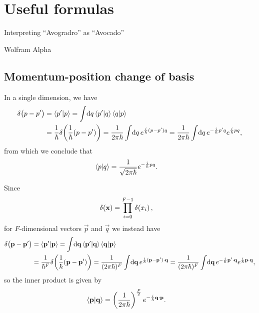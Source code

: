 \chapter{Useful formulas}

\epigraph{
Interpreting ``Avogradro'' as ``Avocado''
}{
Wolfram Alpha
}


\section{Momentum-position change of basis}

In a single dimension, we have~\cite[55-56]{sakurai1985modern}
\begin{subequations}
\begin{align}
	\ddf{p - p'}
	&= \braket{p' | p}
	= \int\! \dif q \braket{p' | q} \braket{q | p} \\
	&= \frac{1}{\hbar} \ddf{\frac{1}{\hbar} (p - p')}
	= \frac{1}{2 \pi \hbar} \int\! \dif q \, e^{\frac{i}{\hbar} (p - p') q}
	= \frac{1}{2 \pi \hbar} \int\! \dif q \, e^{-\frac{i}{\hbar} p' q} e^{\frac{i}{\hbar} p q},
\end{align}
\end{subequations}
from which we conclude that
\begin{align}
	\braket{p | q}
	&= \frac{1}{\sqrt{2 \pi \hbar}} e^{-\frac{i}{\hbar} p q}.
\end{align}

Since~\cite[59]{sakurai1985modern}
\begin{align}
	\delta\!\left( \bm{\mathbf{x}} \right)
	&= \prod_{i=0}^{F-1} \delta\!\left( x_i \right),
\end{align}
for $F$-dimensional vectors $\vec{p}$ and $\vec{q}$ we instead have
\begin{subequations}
\begin{align}
	\ddf{\vec{p} - \vec{p}'}
	&= \braket{\vec{p}' | \vec{p}}
	= \int\! \dif \vec{q} \braket{\vec{p}' | \vec{q}} \braket{\vec{q} | \vec{p}} \\
	&= \frac{1}{\hbar^F} \ddf{\frac{1}{\hbar} (\vec{p} - \vec{p}')}
	= \frac{1}{(2 \pi \hbar)^F} \int\! \dif \vec{q} \, e^{\frac{i}{\hbar} (\vec{p} - \vec{p}') \cdot \vec{q}}
	= \frac{1}{(2 \pi \hbar)^F} \int\! \dif \vec{q} \, e^{-\frac{i}{\hbar} \vec{p}' \cdot \vec{q}} e^{\frac{i}{\hbar} \vec{p} \cdot \vec{q}},
\end{align}
\end{subequations}
so the inner product is given by
\begin{align}
	\braket{\bm{\mathbf{p}} | \bm{\mathbf{q}}}
	&= \left( \frac{1}{2 \pi \hbar} \right)^\frac{F}{2} e^{-\frac{i}{\hbar} \bm{\mathbf{q}} \cdot \bm{\mathbf{p}}}.
		\label{eq:pq-inner}
\end{align}


